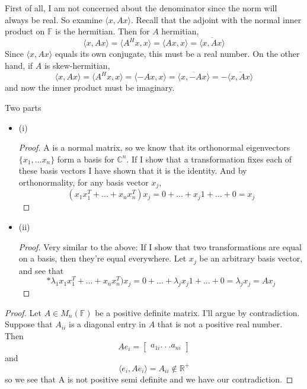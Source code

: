 \documentclass[12pt]{article}
\newenvironment{problem}[2][Problem]{\begin{trivlist}
\item[\hskip \labelsep {\bfseries #1}\hskip \labelsep {\bfseries #2.}]}{\end{trivlist}}
\theoremstyle{definition}
\theoremstyle{definition}
\theoremstyle{definition}
\theoremstyle{definition}
\begin{document}
\begin{problem}{4.24}
First of all, I am not concerned about the denominator since the norm will always be real. So examine $\langle x, Ax \rangle$. Recall that the adjoint with the normal inner product on $\mathbb{F}$ is the hermitian. Then for $A$ hermitian, 
$$ \langle x, Ax \rangle = \langle A^Hx, x \rangle = \langle Ax, x \rangle = \overline{\langle x, Ax \rangle} $$
Since $\langle x,Ax \rangle$ equals its own conjugate, this must be a real number. On the other hand, if $A$ is skew-hermitian, 
$$ \langle x, Ax \rangle = \langle A^Hx, x \rangle = \langle -Ax, x \rangle = \overline{\langle x, -Ax \rangle} = - \overline{\langle x, Ax \rangle} $$
and now the inner product must be imaginary.
\end{problem}

\begin{problem}{4.25} Two parts
\begin{itemize}
\item (i) \begin{proof}
A is a normal matrix, so we know that its orthonormal eigenvectors $\{ x_1, ... x_n \}$ form a basis for $\mathbb{C}^n$. If I show that a transformation fixes each of these basis vectors I have shown that it is the identity. And by orthonormality, for any basis vector $x_j$, 
$$
(x_1x_1^T + ... + x_nx_n^T)x_j = 0 +... + x_j1 + ... + 0 = x_j
$$ 
\end{proof}
\item (ii) 
\begin{proof}
Very similar to the above: If I show that two transformations are equal on a basis, then they're equal everywhere. Let $x_j$ be an arbitrary basis vector, and see that 
$$*\lambda_1 x_1x_1^T + ... + x_nx_n^T)x_j = 0+ ... + \lambda_j x_j 1+... + 0 = \lambda_j x_j = Ax_j 
$$
\end{proof}
\end{itemize}
\end{problem}

\begin{problem}{4.27}
\begin{proof}
Let $A \in M_n(\mathbb{F})$ be a positive definite matrix. I'll argue by contradiction. Suppose that $A_{ii}$ is a diagonal entry in $A$ that is not a positive real number. Then 
$$
A e_i = \begin{bmatrix}
a_{1i}
. \
. \
.
a_{ni}
\end{bmatrix}
$$ 
and 
$$ \langle e_i, Ae_i \rangle = A_{ii} \notin \mathbb{R}^+ $$
so we see that A is not positive semi definite and we have our contradiction.
\end{proof}
\end{problem}
\end{document}
